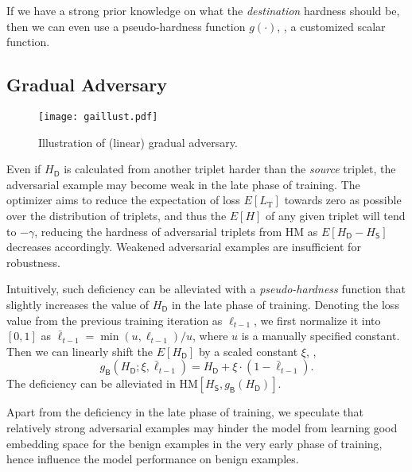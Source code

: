\documentclass[10pt,twocolumn,letterpaper]{article}
\begin{document}
If we have a strong prior knowledge on what the \emph{destination} hardness
should be, then we can even use a pseudo-hardness function $g(\cdot)$, \ie, a
customized scalar function.



\subsection{Gradual Adversary}
\label{sec:32}

\begin{figure}
	\texttt{[image: gaillust.pdf]}
	\caption{Illustration of (linear) gradual adversary.}
	\label{fig:ga}
\end{figure}



Even if $H_\mathsf{D}$ is calculated from another triplet harder than the
\emph{source} triplet, the adversarial example may become weak in the late
phase of training.
%
The optimizer aims to reduce the expectation of 
loss $E[L_\text{T}]$ towards zero as possible over the distribution of triplets, and thus
the $E[H]$ of any given triplet will tend to $-\gamma$, reducing the
hardness of adversarial triplets from HM as $E[H_\mathsf{D}-H_\mathsf{S}]$
decreases accordingly.
%
Weakened adversarial examples are insufficient for robustness.


Intuitively, such deficiency can be alleviated with a \emph{pseudo-hardness}
function that slightly increases the value of $H_\mathsf{D}$ in the late phase
of training.
%
Denoting the loss value from the previous training iteration as $\ell_{t-1}$,
we first normalize it into $[0,1]$ as $\bar{\ell}_{t-1}=\min(u,\ell_{t-1})/u$,
where $u$ is a manually specified constant.
%
Then we can linearly shift the $E[H_\mathsf{D}]$ by a scaled constant $\xi$,
\ie,
%
\begin{equation}
	g_\mathsf{B}(H_\mathsf{D};\xi,\bar{\ell}_{t-1}) =
	H_\mathsf{D} + \xi \cdot (1-\bar{\ell}_{t-1}).
\end{equation}
%
The deficiency can be alleviated in
$\text{HM}[H_\mathsf{S},g_\mathsf{B}(H_\mathsf{D})]$.



Apart from the deficiency in the late phase of training, we speculate that
relatively strong adversarial examples may hinder the model from 
learning good embedding space for the benign examples in the very early phase
of training, hence influence the model performance on benign examples.
\end{document}
